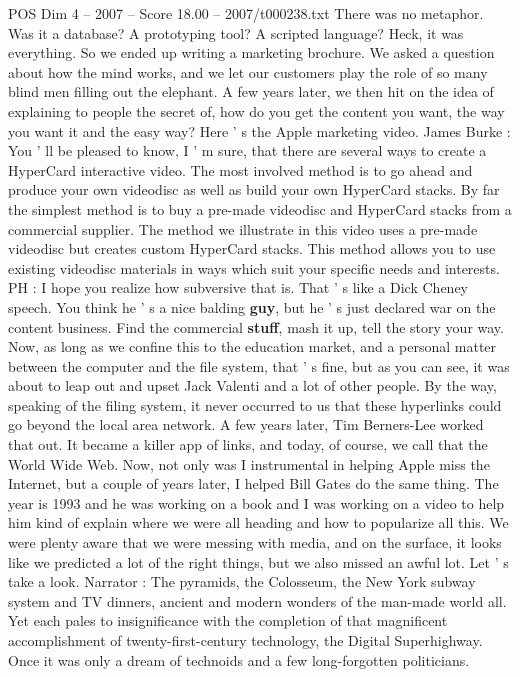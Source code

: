 \begin{textsample}{POS Dim 4 – 2007 – Score 18.00 – 2007/t000238.txt}
There was no metaphor.
Was it a database?
A prototyping tool?
A scripted language?
Heck, it was everything.
So we ended up writing a marketing brochure.
We asked a question about how the mind works, and we let our customers play the role of so many blind men filling out the elephant.
A few years later, we then hit on the idea of explaining to people the secret of, how do you get the content you want, the way you want it and the easy way?
Here ' s the Apple marketing video.
James Burke : You ' ll be pleased to know, I ' m sure, that there are several ways to create a HyperCard interactive video.
The most involved method is to go ahead and produce your own videodisc as well as build your own HyperCard stacks.
By far the simplest method is to buy a pre-made videodisc and HyperCard stacks from a commercial supplier.
The method we illustrate in this video uses a pre-made videodisc but creates custom HyperCard stacks.
This method allows you to use existing videodisc materials in ways which suit your specific needs and interests.
PH : I hope you realize how subversive that is.
That ' s like a Dick Cheney speech.
You think he ' s a nice balding \textbf{guy}, but he ' s just declared war on the content business.
Find the commercial \textbf{stuff}, mash it up, tell the story your way.
Now, as long as we confine this to the education market, and a personal matter between the computer and the file system, that ' s fine, but as you can see, it was about to leap out and upset Jack Valenti and a lot of other people.
By the way, speaking of the filing system, it never occurred to us that these hyperlinks could go beyond the local area network.
A few years later, Tim Berners-Lee worked that out.
It became a killer app of links, and today, of course, we call that the World Wide Web.
Now, not only was I instrumental in helping Apple miss the Internet, but a couple of years later, I helped Bill Gates do the same thing.
The year is 1993 and he was working on a book and I was working on a video to help him kind of explain where we were all heading and how to popularize all this.
We were plenty aware that we were messing with media, and on the surface, it looks like we predicted a lot of the right things, but we also missed an awful lot.
Let ' s take a look.
Narrator : The pyramids, the Colosseum, the New York subway system and TV dinners, ancient and modern wonders of the man-made world all.
Yet each pales to insignificance with the completion of that magnificent accomplishment of twenty-first-century technology, the Digital Superhighway.
Once it was only a dream of technoids and a few long-forgotten politicians.

\end{textsample}

